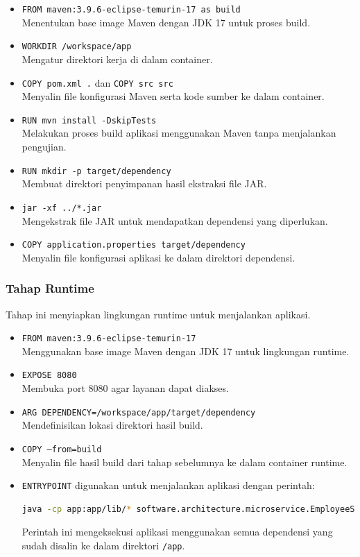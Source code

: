 \begin{itemize}
	\item \texttt{FROM maven:3.9.6-eclipse-temurin-17 as build} \\
	Menentukan base image Maven dengan JDK 17 untuk proses build.
	\item \texttt{WORKDIR /workspace/app} \\
	Mengatur direktori kerja di dalam container.
	\item \texttt{COPY pom.xml .} dan \texttt{COPY src src} \\
	Menyalin file konfigurasi Maven serta kode sumber ke dalam container.
	\item \texttt{RUN mvn install -DskipTests} \\
	Melakukan proses build aplikasi menggunakan Maven tanpa menjalankan pengujian.
	\item \texttt{RUN mkdir -p target/dependency} \\
	Membuat direktori penyimpanan hasil ekstraksi file JAR.
	\item \texttt{jar -xf ../*.jar} \\
	Mengekstrak file JAR untuk mendapatkan dependensi yang diperlukan.
	\item \texttt{COPY application.properties target/dependency} \\
	Menyalin file konfigurasi aplikasi ke dalam direktori dependensi.
\end{itemize}

\subsubsection{Tahap Runtime}
Tahap ini menyiapkan lingkungan runtime untuk menjalankan aplikasi.

\begin{itemize}
	\item \texttt{FROM maven:3.9.6-eclipse-temurin-17} \\
	Menggunakan base image Maven dengan JDK 17 untuk lingkungan runtime.
	\item \texttt{EXPOSE 8080} \\
	Membuka port 8080 agar layanan dapat diakses.
	\item \texttt{ARG DEPENDENCY=/workspace/app/target/dependency} \\
	Mendefinisikan lokasi direktori hasil build.
	\item \texttt{COPY --from=build} \\
	Menyalin file hasil build dari tahap sebelumnya ke dalam container runtime.
	\item \texttt{ENTRYPOINT} digunakan untuk menjalankan aplikasi dengan perintah:
	\begin{lstlisting}[language=bash]
		java -cp app:app/lib/* software.architecture.microservice.EmployeeServiceApplication
	\end{lstlisting}
	Perintah ini mengeksekusi aplikasi menggunakan semua dependensi yang sudah disalin ke dalam direktori \texttt{/app}.
\end{itemize}

